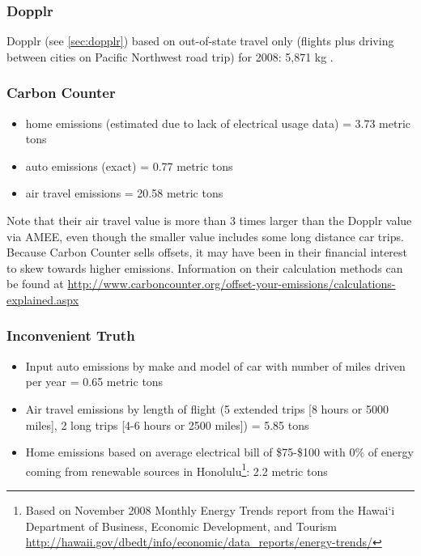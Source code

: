 \subsubsection{Dopplr}
Dopplr (see \autoref{sec:dopplr}) based on out-of-state travel only (flights plus driving between cities on Pacific Northwest road trip) for 2008: 5,871 kg \COtwo.

\subsubsection{Carbon Counter}
\begin{itemize}
	\item home emissions (estimated due to lack of electrical usage data) = 3.73 metric tons \COtwo
	\item auto emissions (exact) = 0.77 metric tons \COtwo
	\item air travel emissions = 20.58 metric tons \COtwo
\end{itemize}

Note that their air travel \COtwo value is more than 3 times larger than the Dopplr value via AMEE, even though the smaller value includes some long distance car trips. Because Carbon Counter sells offsets, it may have been in their financial interest to skew towards higher emissions. Information on their calculation methods can be found at \url{http://www.carboncounter.org/offset-your-emissions/calculations-explained.aspx}

\subsubsection{Inconvenient Truth}
\begin{itemize}
	\item Input auto emissions by make and model of car with number of miles driven per year = 0.65 metric tons \COtwo
	\item Air travel emissions by length of flight (5 extended trips [8 hours or 5000 miles], 2 long trips [4-6 hours or 2500 miles]) = 5.85 tons \COtwo
	\item Home emissions based on average electrical bill of \$75-\$100 with 0\% of energy coming from renewable sources in Honolulu\footnote{Based on November 2008 Monthly Energy Trends report from the Hawai`i Department of Business, Economic Development, and Tourism \url{http://hawaii.gov/dbedt/info/economic/data_reports/energy-trends/}}: 2.2 metric tons \COtwo
\end{itemize}